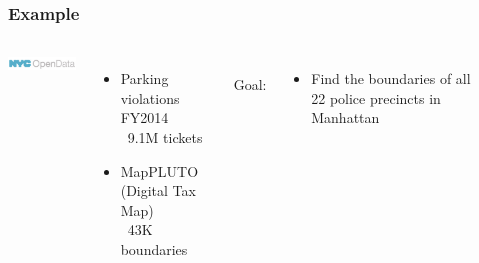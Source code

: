 \documentclass[12pt]{beamer}
\begin{document}
\begin{frame}[t]
\frametitle{Example}

\begin{columns}

\includegraphics[width=1.5in]{imgs/nyc.png}

\begin{itemize}
\item Parking violations FY2014 \\ ~9.1M tickets
\item MapPLUTO (Digital Tax Map) \\ ~43K boundaries
\end{itemize}

~\\

Goal:
\begin{itemize}
\item Find the boundaries of all 22 police precincts in Manhattan
\end{itemize}

~\\



\end{columns}
\end{frame}
\end{document}
